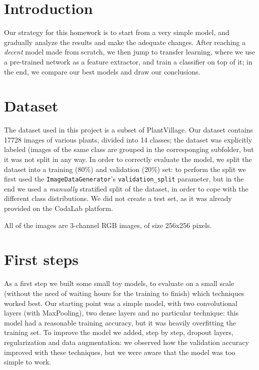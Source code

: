 \documentclass[10.5pt,a4paper,twocolumn]{article}
\begin{document}



\section{Introduction}
\label{sec:introduction}
Our strategy for this homework is to start from a very simple model, and gradually analyze the results and make the adequate changes.
After reaching a \textit{decent} model made from scratch, we then jump to transfer learning, where we use a pre-trained network as a feature extractor, and train a classifier on top of it;
in the end, we compare our best models and draw our conclusions.

\section{Dataset}
\label{sec:dataset}
The dataset used in this project is a subset of PlantVillage.
Our dataset contains 17728 images of various plants, divided into 14 classes; 
the dataset was explicitly labeled (images of the same class are grouped in the corresponging subfolder, but it was not split in any way.
In order to correctly evaluate the model, we split the dataset into a training (80\%) and validation (20\%) set: 
to perform the split we first used the \texttt{ImageDataGenerator}'s \texttt{validation\_split} parameter, but in the end we used 
a \textit{manually} stratified split of the dataset, in order to cope with the different class distributions. 
We did not create a test set, as it was already provided on the CodaLab platform. 

All of the images are 3-channel RGB images, of size 256x256 pixels.

\section{First steps}
\label{sec:first_steps}
As a first step we built some small toy models, to evaluate on a small scale (without the need of waiting hours for the training to finish) which techniques worked best.
Our starting point was a simple model, with two convolutional layers (with MaxPooling), two dense layers and no particular technique: this model had a reasonable training accuracy,
but it was heavily overfitting the training set. To improve the model we added, step by step, dropout layers, regularization and data augmentation:
we observed how the validation accuracy improved with these techniques, but we were aware that the model was too simple to work.
\end{document}
